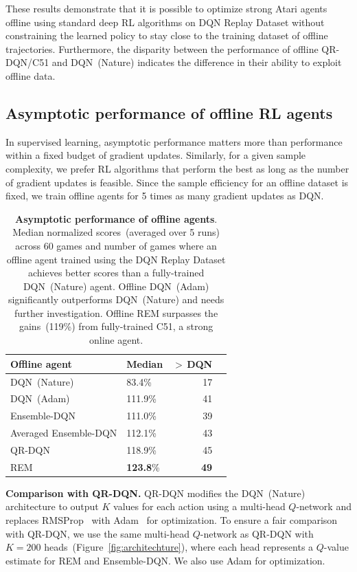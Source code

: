 These results demonstrate that it is possible to optimize strong Atari agents offline using standard deep RL algorithms on DQN Replay Dataset
without constraining the learned policy to stay close to the training dataset of offline trajectories.
Furthermore, the disparity between the performance of offline QR-DQN/C51 and DQN~(Nature)
indicates the difference in their ability to exploit offline data.


\subsection{Asymptotic performance of offline RL agents}

In supervised learning, asymptotic performance matters more than performance within a fixed budget of gradient updates.
Similarly, for a given sample complexity, we prefer RL algorithms that perform the best as long as the number of gradient updates
is feasible. Since the sample efficiency for an offline dataset is fixed, we train offline agents for 5 times as many gradient updates as DQN.

\begin{table}[t]
    \caption{\textbf{Asymptotic performance of offline agents}. Median normalized scores~(averaged over 5 runs) across 60 games and number of games where an offline agent trained using the DQN Replay Dataset achieves better scores than a fully-trained DQN~(Nature) agent.
    Offline DQN~(Adam) significantly outperforms DQN~(Nature) and needs further investigation.
    Offline REM surpasses the gains~(119\%) from fully-trained C51, a strong online agent.
    }\label{table:results_summary}
      \centering
      \small
    \begin{tabular}{llrr}
    \toprule
    Offline agent & Median & $>\,$DQN \\
    \midrule
    DQN~(Nature) & 83.4\%  & 17 \\
    DQN~(Adam) & 111.9\% & 41 \\
    Ensemble-DQN & 111.0\% & 39\\
    Averaged Ensemble-DQN & 112.1\% & 43 \\
    QR-DQN     & 118.9\% & 45 \\
    REM      & \textbf{123.8}\%  & \textbf{49} \\
    \bottomrule
    \end{tabular}
\vspace{-0.55cm}
\end{table}


{\bf Comparison with QR-DQN.} QR-DQN modifies the DQN~(Nature) architecture to output $K$ values for each action using a multi-head $Q$-network and replaces RMSProp~\citep{tieleman2012lecture} with Adam~\citep{kingma2014adam} for optimization. To ensure a fair comparison with QR-DQN, we use the same multi-head $Q$-network as QR-DQN with $K=200$ heads~(Figure~\ref{fig:architechture}), where each head represents a $Q$-value estimate for REM and Ensemble-DQN. We also use Adam for optimization.%

